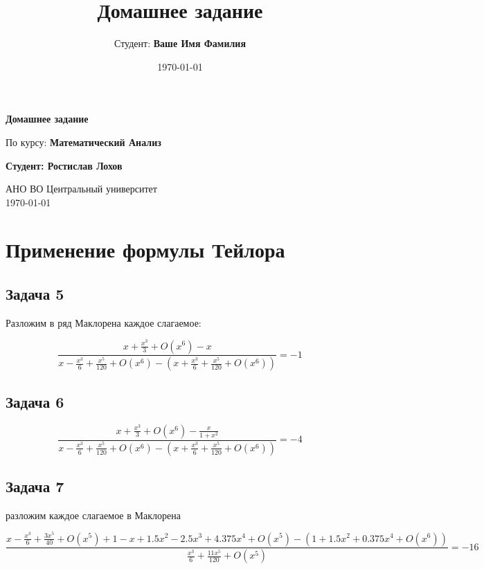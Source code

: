 \documentclass[a4paper,12pt]{article}
\title{Домашнее задание}
\author{Студент: \textbf{Ваше Имя Фамилия}}
\date{\today}
\begin{document}
\begin{titlepage}
    \centering
    \vspace*{1cm}

    \Huge
    \textbf{Домашнее задание}

    \vspace{0.5cm}
    \LARGE
    По курсу: \textbf{Математический Анализ}

    \vspace{1.5cm}

    \textbf{Студент: Ростислав Лохов}

    \vfill

    \Large
    АНО ВО Центральный университет\\
    \vspace{0.3cm}
    \today

\end{titlepage}

\tableofcontents
\newpage

\section{Применение формулы Тейлора}

\subsection{Задача 5}

Разложим в ряд Маклорена каждое слагаемое:

\[
\frac{x + \frac{x^3}{3}+O(x^6)-x}{x-\frac{x^3}{6}+\frac{x^5}{120}+O(x^6)-(x+\frac{x^3}{6}+\frac{x^5}{120}+O(x^6))} =  -1
\]

\subsection{Задача 6}

\[
\frac{x + \frac{x^3}{3}+O(x^6)-\frac{x}{1+x^2}}{x-\frac{x^3}{6}+\frac{x^5}{120}+O(x^6)-(x+\frac{x^3}{6}+\frac{x^5}{120}+O(x^6))} = -4
\]

\subsection{Задача 7}

разложим каждое слагаемое в Маклорена

\[
\frac{x-\frac{x^3}{6}+\frac{3x^5}{40}+O(x^5)+1-x+1.5x^2-2.5x^3+4.375x^4+O(x^5)-(1+1.5x^2+0.375x^4+O(x^6))}{\frac{x^3}{6}+\frac{11x^5}{120}+O(x^5)} = -16
\]
\end{document}
